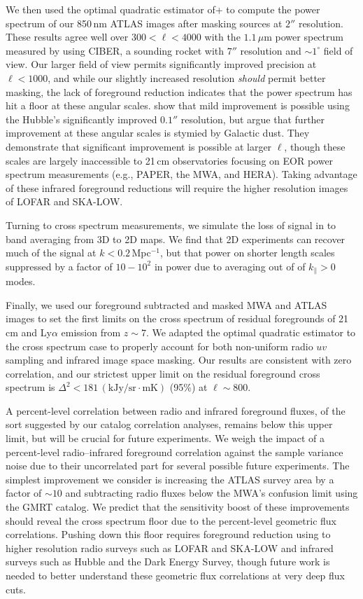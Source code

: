 \documentclass[numberedappendix]{emulateapj}
\begin{document}
We then used the optimal quadratic estimator of+ \citet{Maxpowerspeclossless} to compute the power spectrum of our 850\,nm ATLAS images after masking sources at $2''$ resolution. These results agree well over $300<\ell<4000$ with the $1.1$\,$\mu$m power spectrum measured by \citep{zemcov14} using CIBER, a sounding rocket with $7''$ resolution and $\sim1^\circ$ field of view. Our larger field of view permits significantly improved precision at $\ell<1000$, and while our slightly increased resolution \textit{should} permit better masking, the lack of foreground reduction indicates that the power spectrum has hit a floor at these angular scales. \citet{mw15} show that mild improvement is possible using the Hubble's significantly improved $0.1''$ resolution, but argue that further improvement at these angular scales is stymied by Galactic dust. They demonstrate that significant improvement is possible at larger $\ell$, though these scales are largely inaccessible to 21\,cm observatories focusing on EOR power spectrum measurements (e.g., PAPER, the MWA, and HERA). Taking advantage of these infrared foreground reductions will require the higher resolution images of  LOFAR and SKA-LOW.

Turning to cross spectrum measurements, we simulate the loss of signal in to band averaging from 3D to 2D maps. We find that 2D experiments can recover much of the signal at $k<0.2$\,Mpc$^{-1}$, but that power on shorter length scales  suppressed by a factor of $10-10^2$ in power due to averaging out of of $k_\parallel>0$ modes. 

Finally, we used our foreground subtracted and masked MWA and ATLAS images to set the first limits on the cross spectrum of residual foregrounds of 21\,cm and Ly$\alpha$ emission  from $z\sim7$. We adapted the optimal quadratic estimator to the cross spectrum case to properly account for both non-uniform radio $uv$ sampling and infrared image space masking. Our results are consistent with zero correlation, and our strictest upper limit on the residual foreground cross spectrum is $\Delta^2<181$\,$(\text{kJy/sr}\cdot \text{mK})$ (95\%) at $\ell\sim800$.

A percent-level correlation between radio and infrared foreground fluxes, of the sort suggested by our catalog correlation analyses, remains below this upper limit, but will be crucial for future experiments. We weigh the impact of a percent-level radio--infrared foreground correlation against the sample variance noise due to their uncorrelated part for several possible future experiments. The simplest improvement we consider is increasing the ATLAS survey area by a factor of $\sim10$ and subtracting radio fluxes below the MWA's confusion limit using the GMRT catalog. We predict that the sensitivity boost of these improvements should reveal the cross spectrum floor due to the percent-level geometric flux correlations. Pushing down this floor requires foreground reduction using to higher resolution radio surveys such as LOFAR and SKA-LOW and infrared surveys such as Hubble and the Dark Energy Survey, though future work is needed to better understand these geometric flux correlations at very deep flux cuts.
\end{document}
